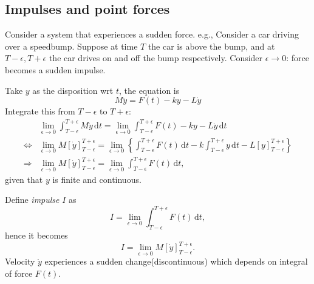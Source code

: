 \documentclass[10pt]{article}
\begin{document}
      \subsection{Impulses and point forces}
      Consider a system that experiences a sudden force. e.g., Consider a car driving over a speedbump. Suppose at time $T$ the car is above the bump, and at $T-\epsilon, T+\epsilon$ the car drives on and off the bump respectively. Consider $ \epsilon\to 0 $: force becomes a sudden impulse.
      \begin{center}
      \end{center}
      Take $y$ as the disposition wrt $t$, the equation is 
      \begin{equation}
          M \ddot{y} = F(t)-ky-L \dot{y}
      \end{equation}
      Integrate this from $T-\epsilon$ to $T+\epsilon$:
      \[
          \begin{aligned}
            &\lim_{\epsilon \to 0} \int_{T-\epsilon}^{T+\epsilon} M \ddot{y} \,\mathrm{d}t = \lim_{\epsilon \to 0} \int_{T-\epsilon}^{T+\epsilon} F(t)-ky-L \dot{y} \,\mathrm{d}t\\
            \Longleftrightarrow & \lim_{\epsilon \to 0} M\left[ \dot{y} \right]_{T-\epsilon}^{T+\epsilon} = \lim_{\epsilon \to 0} \left\{ \int_{T-\epsilon}^{T+\epsilon} F(t) \,\mathrm{d}t - k \int_{T-\epsilon}^{T+\epsilon} y \,\mathrm{d}t - L\left[ y \right]_{T-\epsilon}^{T+\epsilon}\right\}\\
            \Longrightarrow & \lim_{\epsilon \to 0} M\left[ \dot{y} \right]_{T-\epsilon}^{T+\epsilon} = \lim_{\epsilon \to 0} \int_{T-\epsilon}^{T+\epsilon} F(t) \,\mathrm{d}t,
          \end{aligned}
      \]
      given that $y$ is finite and continuous.

      Define \textit{impulse} $I$ as 
      \[
          I =\lim_{\epsilon \to 0} \int_{T-\epsilon}^{T+\epsilon} F(t) \,\mathrm{d}t
      ,\]
      hence it becomes 
      \[
          I = \lim_{\epsilon \to 0} M\left[ \dot{y} \right]_{T-\epsilon}^{T+\epsilon}
      .\]
      Velocity $ \dot{y} $ experiences a sudden change(discontinuous) which depends on integral of force $ F(t) $.
\end{document}

